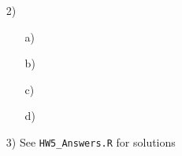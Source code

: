 \documentclass{article}
\begin{document}
\begin{itemize}
\begin{itemize}
    \end{itemize}
  \item[2)]
    \begin{itemize}
     \item[a)]
     \item[b)]
     \item[c)]     
     \item[d)]      
   \end{itemize}
\item[3)] See \texttt{HW5\_Answers.R} for solutions
\end{itemize}     
\end{document}
